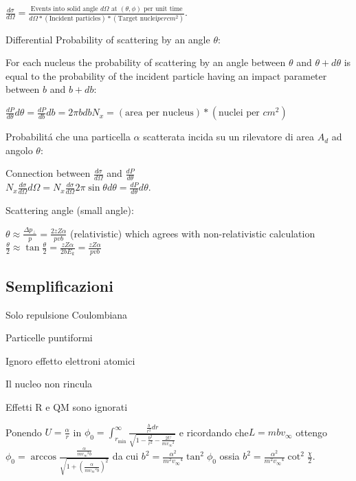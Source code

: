\documentclass[main.tex]{subfiles}
\begin{document}
$\frac{d\sigma}{d\Omega}=\frac{\text{Events into solid angle $d\Omega$ at $(\theta,\phi)$ per unit time}}{d\Omega*(\text{Incident particles})*(\text{Target nuclei} per cm^2)}$.

Differential Probability of scattering by an angle $\theta$:

For each nucleus the probability of scattering by an angle between $\theta$ and $\theta+d\theta$ is equal to the probability of the incident particle having an impact parameter between $b$ and $b+db$:

$\frac{dP}{d\theta}d\theta=\frac{dP}{db}db=2\pi bdbN_x=(\text{area per nucleus})*(\text{nuclei per }cm^2)$

Probabilit\'a che una particella $\alpha$ scatterata incida su un rilevatore di area $A_d$ ad angolo $\theta$:

Connection between $\frac{d\sigma}{d\Omega}$ and $\frac{dP}{d\theta}$\\
$N_x\frac{d\sigma}{d\Omega}d\Omega=N_x\frac{d\sigma}{d\Omega}2\pi\sin{\theta}d\theta=\frac{dP}{d\theta}d\theta$.

Scattering angle (small angle):

$\theta\approx\frac{\Delta p_{\perp}}{p}=\frac{2zZ\alpha}{pvb}$ (relativistic) which agrees with non-relativistic calculation $\frac{\theta}{2}\approx\tan{\frac{\theta}{2}}=\frac{zZ\alpha}{2bE_k}=\frac{zZ\alpha}{pvb}$

\subsection{Semplificazioni}
\begin{enumerate*}
\item Solo repulsione Coulombiana
\item Particelle puntiformi
\item Ignoro effetto elettroni atomici
\item Il nucleo non rincula
\item Effetti R e QM sono ignorati
\end{enumerate*}

 Ponendo $U=\frac{\alpha}{r}$ in $\phi_0=\int_{r_{\text{min}}}^{\infty}\frac{\frac{b}{r^2}dr}{\sqrt{1-\frac{b^2}{r^2}-\frac{2U}{m{v_{\infty}}^2}}}$ e ricordando che$L=mbv_{\infty}$ ottengo $\phi_0=\arccos{\frac{\frac{\alpha}{m{v_{\infty}}^2b}}{\sqrt{1+(\frac{\alpha}{m{v_{\infty}}^2b})^2}}}$ da cui $b^2=\frac{\alpha^2}{m^2{v_{\infty}}^4}\tan^2{\phi_0}$ ossia $b^2=\frac{\alpha^2}{m^2{v_{\infty}}^4}\cot^2{\frac{\chi}{2}}$.
 
\end{document}
